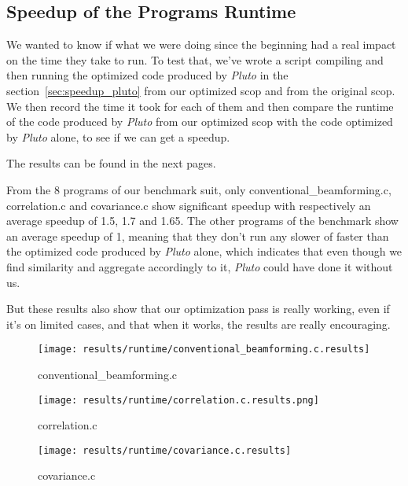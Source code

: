 \documentclass[paper=a4, fontsize=11.5pt]{scrartcl}
\numberwithin{equation}{section}        %
\numberwithin{figure}{section}          %
\numberwithin{table}{section}               %
\begin{document}
\subsection{Speedup of the Programs Runtime}

We wanted to know if what we were doing since the beginning had a real impact on the time they
take to run. To test that, we've wrote a script compiling and then running the optimized code
produced by \textit{Pluto} in the section~\ref{sec:speedup_pluto} from our optimized scop and
from the original scop. We then record the time it took for each of them and then compare
the runtime of the code produced by \textit{Pluto} from our optimized scop with the code
optimized by \textit{Pluto} alone, to see if we can get a speedup.

The results can be found in the next pages. 

\bigskip

From the 8 programs of our benchmark suit, only conventional\_beamforming.c,
correlation.c and covariance.c show significant speedup with respectively an average speedup of
1.5, 1.7 and 1.65. The other programs of the benchmark show an average speedup of 1, meaning
that they don't run any slower of faster than the optimized code produced by \textit{Pluto} alone,
which indicates that even though we find similarity and aggregate accordingly to it, \textit{Pluto}
could have done it without us.

But these results also show that our optimization pass is really working, even if
it's on limited cases, and that when it works, the results are really encouraging.

\begin{figure}[H]
    \center
    \texttt{[image: results/runtime/conventional\_beamforming.c.results]}
    \caption{conventional\_beamforming.c}\label{fig:runtime:conv_beam}
\end{figure}
\begin{figure}[H]
    \center
    \texttt{[image: results/runtime/correlation.c.results.png]}
    \caption{correlation.c}\label{fig:runtime:correlation}
    \texttt{[image: results/runtime/covariance.c.results]}
    \caption{covariance.c}\label{fig:runtime:covariance}
\end{figure}
\restoregeometry

\end{document}
